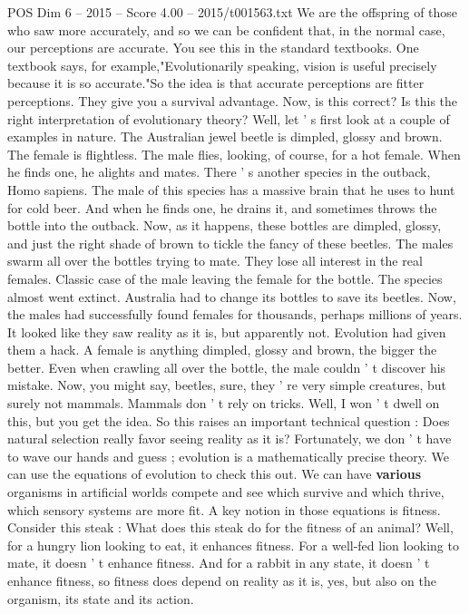 \begin{textsample}{POS Dim 6 – 2015 – Score 4.00 – 2015/t001563.txt}
We are the offspring of those who saw more accurately, and so we can be confident that, in the normal case, our perceptions are accurate.
You see this in the standard textbooks.
One textbook says, for example,"Evolutionarily speaking, vision is useful precisely because it is so accurate."So the idea is that accurate perceptions are fitter perceptions.
They give you a survival advantage.
Now, is this correct?
Is this the right interpretation of evolutionary theory?
Well, let ' s first look at a couple of examples in nature.
The Australian jewel beetle is dimpled, glossy and brown.
The female is flightless.
The male flies, looking, of course, for a hot female.
When he finds one, he alights and mates.
There ' s another species in the outback, Homo sapiens.
The male of this species has a massive brain that he uses to hunt for cold beer.
And when he finds one, he drains it, and sometimes throws the bottle into the outback.
Now, as it happens, these bottles are dimpled, glossy, and just the right shade of brown to tickle the fancy of these beetles.
The males swarm all over the bottles trying to mate.
They lose all interest in the real females.
Classic case of the male leaving the female for the bottle.
The species almost went extinct.
Australia had to change its bottles to save its beetles.
Now, the males had successfully found females for thousands, perhaps millions of years.
It looked like they saw reality as it is, but apparently not.
Evolution had given them a hack.
A female is anything dimpled, glossy and brown, the bigger the better.
Even when crawling all over the bottle, the male couldn ' t discover his mistake.
Now, you might say, beetles, sure, they ' re very simple creatures, but surely not mammals.
Mammals don ' t rely on tricks.
Well, I won ' t dwell on this, but you get the idea.
So this raises an important technical question : Does natural selection really favor seeing reality as it is?
Fortunately, we don ' t have to wave our hands and guess ; evolution is a mathematically precise theory.
We can use the equations of evolution to check this out.
We can have \textbf{various} organisms in artificial worlds compete and see which survive and which thrive, which sensory systems are more fit.
A key notion in those equations is fitness.
Consider this steak : What does this steak do for the fitness of an animal?
Well, for a hungry lion looking to eat, it enhances fitness.
For a well-fed lion looking to mate, it doesn ' t enhance fitness.
And for a rabbit in any state, it doesn ' t enhance fitness, so fitness does depend on reality as it is, yes, but also on the organism, its state and its action.

\end{textsample}
